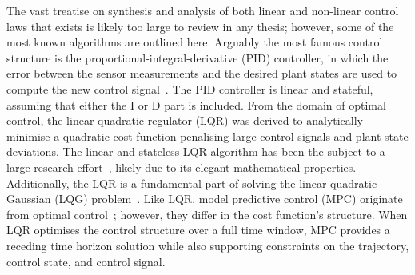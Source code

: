 The vast treatise on synthesis and analysis of both linear and non-linear control laws that exists is likely too large to review in any thesis; however, some of the most known algorithms are outlined here.
Arguably the most famous control structure is the proportional-integral-derivative (PID) controller, in which the error between the sensor measurements and the desired plant states are used to compute the new control signal~\cite{Astrom:2006}.
The PID controller is linear and stateful, assuming that either the I or D part is included.
From the domain of optimal control, the linear-quadratic regulator (LQR) was derived to analytically minimise a quadratic cost function penalising large control signals and plant state deviations.
The linear and stateless LQR algorithm has been the subject to a large research effort~\addref{}, likely due to its elegant mathematical properties.
Additionally, the LQR is a fundamental part of solving the linear-quadratic-Gaussian (LQG) problem~\addref{}.
Like LQR, model predictive control (MPC) originate from optimal control~\addref{}; however, they differ in the cost function's structure.
When LQR optimises the control structure over a full time window, MPC provides a receding time horizon solution while also supporting constraints on the trajectory, control state, and control signal.


